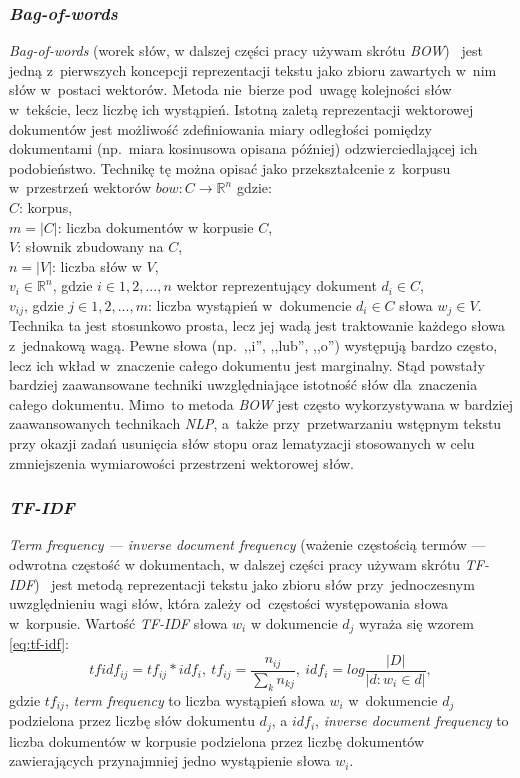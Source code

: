 \documentclass[pl]{minipw} %
\begin{document}
\subsubsection{\textit{Bag-of-words}}
\textit{Bag-of-words} (worek słów, w dalszej części pracy używam skrótu \textit{BOW})~\cite{bow} jest jedną z~pierwszych koncepcji reprezentacji tekstu jako zbioru zawartych w~nim słów w~postaci wektorów. Metoda nie~bierze pod~uwagę kolejności słów w~tekście, lecz liczbę ich wystąpień. Istotną zaletą reprezentacji wektorowej dokumentów jest możliwość zdefiniowania miary odległości pomiędzy dokumentami (np.~miara kosinusowa opisana później) odzwierciedlającej ich podobieństwo. Technikę tę można opisać jako przekształcenie z~korpusu w~przestrzeń wektorów $ bow: C \to \mathbb{R}^n $ gdzie:\\
$C$: korpus,\\
$m = |C|$: liczba dokumentów w korpusie $C$,\\
$V$: słownik zbudowany na $C$,\\
$n = |V|$: liczba słów w $V$,\\
$v_i \in \mathbb{R}^n$, gdzie $i \in 1, 2, ..., n$ wektor reprezentujący dokument $d_i \in C$,\\
$v_{ij}$, gdzie $j \in 1, 2, ..., m$: liczba wystąpień w~dokumencie  $d_i \in C$ słowa $w_j \in V$.\\

Technika ta jest stosunkowo prosta, lecz jej wadą jest traktowanie każdego słowa z~jednakową wagą. Pewne słowa (np.~,,i'', ,,lub'', ,,o'') występują bardzo często, lecz ich wkład w~znaczenie całego dokumentu jest marginalny. Stąd powstały bardziej zaawansowane techniki uwzględniające istotność słów dla~znaczenia całego dokumentu. Mimo~to metoda \textit{BOW} jest często wykorzystywana w bardziej zaawansowanych technikach \textit{NLP}, a~także przy~przetwarzaniu wstępnym tekstu przy okazji zadań usunięcia słów stopu oraz lematyzacji stosowanych w celu zmniejszenia wymiarowości przestrzeni wektorowej słów.
\subsubsection{\textit{TF-IDF}}

\textit{Term frequency --- inverse document frequency} (ważenie częstością termów --- odwrotna częstość w dokumentach, w dalszej części pracy używam skrótu \textit{TF-IDF})~\cite{tf_idf} jest metodą reprezentacji tekstu jako zbioru słów przy~jednoczesnym uwzględnieniu wagi słów, która zależy od~częstości występowania słowa w~korpusie.
Wartość \textit{TF-IDF} słowa $w_i$ w dokumencie $d_j$ wyraża się wzorem \ref{eq:tf-idf}: 
\begin{equation}
\label{eq:tf-idf}
tfidf_{ij} = tf_{ij} * idf_i,\ tf_{ij} = \frac{n_{ij}}{\sum\limits_{k}n_{kj}},\ idf_i = log\frac{|D|}{|{d:w_i \in d}|},
\end{equation}
gdzie $tf_{ij}$, \textit{term frequency} to liczba wystąpień słowa $w_i$ w~dokumencie $d_j$ podzielona przez liczbę słów dokumentu $d_j$, a $idf_i$, \textit{inverse document frequency} to liczba dokumentów w korpusie podzielona przez liczbę dokumentów zawierających przynajmniej jedno wystąpienie słowa $w_i$.
\end{document}
